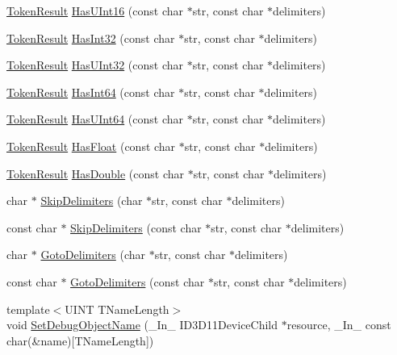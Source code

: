 \begin{DoxyCompactItemize}
\item 
\hyperlink{namespacemage_a2178ba2411db5912f41b2e7698c2037d}{Token\+Result} \hyperlink{namespacemage_a1dd9c4b40b7b0e084a3014f8fd9f26ca}{Has\+U\+Int16} (const char $\ast$str, const char $\ast$delimiters)
\item 
\hyperlink{namespacemage_a2178ba2411db5912f41b2e7698c2037d}{Token\+Result} \hyperlink{namespacemage_a78f76aec12a47505136e00224e4bf9ce}{Has\+Int32} (const char $\ast$str, const char $\ast$delimiters)
\item 
\hyperlink{namespacemage_a2178ba2411db5912f41b2e7698c2037d}{Token\+Result} \hyperlink{namespacemage_a2b7625293b098b935d6fe3b251573018}{Has\+U\+Int32} (const char $\ast$str, const char $\ast$delimiters)
\item 
\hyperlink{namespacemage_a2178ba2411db5912f41b2e7698c2037d}{Token\+Result} \hyperlink{namespacemage_a59d8d6302b2f0cd017dfa2217ac536b0}{Has\+Int64} (const char $\ast$str, const char $\ast$delimiters)
\item 
\hyperlink{namespacemage_a2178ba2411db5912f41b2e7698c2037d}{Token\+Result} \hyperlink{namespacemage_a49b54d6a4244d71dc63237ead3a6307e}{Has\+U\+Int64} (const char $\ast$str, const char $\ast$delimiters)
\item 
\hyperlink{namespacemage_a2178ba2411db5912f41b2e7698c2037d}{Token\+Result} \hyperlink{namespacemage_a8ebb1c7757b2869a4d3dc3c60c3a836d}{Has\+Float} (const char $\ast$str, const char $\ast$delimiters)
\item 
\hyperlink{namespacemage_a2178ba2411db5912f41b2e7698c2037d}{Token\+Result} \hyperlink{namespacemage_ac039d6b5a481b26e7440672a75ad70df}{Has\+Double} (const char $\ast$str, const char $\ast$delimiters)
\item 
char $\ast$ \hyperlink{namespacemage_a0a49375006b3808200d86271f62dbbc2}{Skip\+Delimiters} (char $\ast$str, const char $\ast$delimiters)
\item 
const char $\ast$ \hyperlink{namespacemage_acd903800f144d88982aa559730b9a165}{Skip\+Delimiters} (const char $\ast$str, const char $\ast$delimiters)
\item 
char $\ast$ \hyperlink{namespacemage_a1f8c73ddfbe8a370be1800627136b2ca}{Goto\+Delimiters} (char $\ast$str, const char $\ast$delimiters)
\item 
const char $\ast$ \hyperlink{namespacemage_a3cbc104feb30a9abd8dcec1a77b918b0}{Goto\+Delimiters} (const char $\ast$str, const char $\ast$delimiters)
\item 
{\footnotesize template$<$U\+I\+NT T\+Name\+Length$>$ }\\void \hyperlink{namespacemage_a88833e1a7c6ad614ff6e88cb10eff532}{Set\+Debug\+Object\+Name} (\+\_\+\+In\+\_\+ I\+D3\+D11\+Device\+Child $\ast$resource, \+\_\+\+In\+\_\+ const char(\&name)\mbox{[}T\+Name\+Length\mbox{]})

\end{DoxyCompactItemize}
